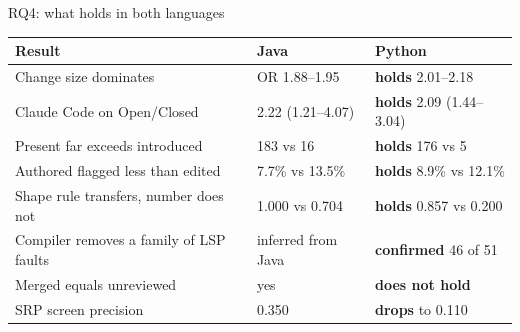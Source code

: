 \documentclass[11pt,aspectratio=169]{beamer}
\begin{document}
\begin{frame}{RQ4: what holds in both languages}
\centering
\small
\begin{tabular}{@{}L{5.2cm}L{3.3cm}L{4.1cm}@{}}
\toprule
\textbf{Result} & \textbf{Java} & \textbf{Python} \\
\midrule
Change size dominates & OR 1.88--1.95 & \textcolor{goodgreen}{\textbf{holds}} 2.01--2.18 \\
Claude Code on Open/Closed & 2.22 (1.21--4.07) & \textcolor{goodgreen}{\textbf{holds}} 2.09 (1.44--3.04) \\
Present far exceeds introduced & 183 vs 16 & \textcolor{goodgreen}{\textbf{holds}} 176 vs 5 \\
Authored flagged less than edited & 7.7\% vs 13.5\% & \textcolor{goodgreen}{\textbf{holds}} 8.9\% vs 12.1\% \\
Shape rule transfers, number does not & 1.000 vs 0.704 & \textcolor{goodgreen}{\textbf{holds}} 0.857 vs 0.200 \\
Compiler removes a family of LSP faults & inferred from Java & \textcolor{goodgreen}{\textbf{confirmed}} 46 of 51 \\
Merged equals unreviewed & yes & \textcolor{ispcolor}{\textbf{does not hold}} \\
SRP screen precision & 0.350 & \textcolor{ispcolor}{\textbf{drops}} to 0.110 \\
\bottomrule
\end{tabular}
\end{frame}
\end{document}
